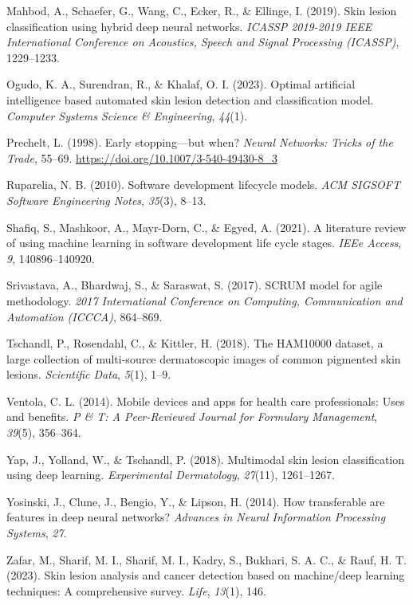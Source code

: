 \documentclass[
  12pt,
  oneside]{article}
\newlength{\cslhangindent}
\newenvironment{CSLReferences}[2] %
 {\begin{list}{}{%
  \setlength{\itemindent}{0pt}
  \setlength{\leftmargin}{0pt}
  \setlength{\parsep}{0pt}
  \ifodd #1
   \setlength{\leftmargin}{\cslhangindent}
   \setlength{\itemindent}{-1\cslhangindent}
  \fi
  \setlength{\itemsep}{#2\baselineskip}}}
 {\end{list}}
\begin{document}
\begin{CSLReferences}{1}{0}
Mahbod, A., Schaefer, G., Wang, C., Ecker, R., \& Ellinge, I. (2019).
Skin lesion classification using hybrid deep neural networks.
\emph{ICASSP 2019-2019 IEEE International Conference on Acoustics,
Speech and Signal Processing (ICASSP)}, 1229--1233.

Ogudo, K. A., Surendran, R., \& Khalaf, O. I. (2023). Optimal artificial
intelligence based automated skin lesion detection and classification
model. \emph{Computer Systems Science \& Engineering}, \emph{44}(1).

Prechelt, L. (1998). Early stopping---but when? \emph{Neural Networks:
Tricks of the Trade}, 55--69.
\url{https://doi.org/10.1007/3-540-49430-8_3}

Ruparelia, N. B. (2010). Software development lifecycle models.
\emph{ACM SIGSOFT Software Engineering Notes}, \emph{35}(3), 8--13.

Shafiq, S., Mashkoor, A., Mayr-Dorn, C., \& Egyed, A. (2021). A
literature review of using machine learning in software development life
cycle stages. \emph{IEEe Access}, \emph{9}, 140896--140920.

Srivastava, A., Bhardwaj, S., \& Saraswat, S. (2017). SCRUM model for
agile methodology. \emph{2017 International Conference on Computing,
Communication and Automation (ICCCA)}, 864--869.

Tschandl, P., Rosendahl, C., \& Kittler, H. (2018). The HAM10000
dataset, a large collection of multi-source dermatoscopic images of
common pigmented skin lesions. \emph{Scientific Data}, \emph{5}(1),
1--9.

Ventola, C. L. (2014). Mobile devices and apps for health care
professionals: Uses and benefits. \emph{P \& T: A Peer-Reviewed Journal
for Formulary Management}, \emph{39}(5), 356--364.

Yap, J., Yolland, W., \& Tschandl, P. (2018). Multimodal skin lesion
classification using deep learning. \emph{Experimental Dermatology},
\emph{27}(11), 1261--1267.

Yosinski, J., Clune, J., Bengio, Y., \& Lipson, H. (2014). How
transferable are features in deep neural networks? \emph{Advances in
Neural Information Processing Systems}, \emph{27}.

Zafar, M., Sharif, M. I., Sharif, M. I., Kadry, S., Bukhari, S. A. C.,
\& Rauf, H. T. (2023). Skin lesion analysis and cancer detection based
on machine/deep learning techniques: A comprehensive survey.
\emph{Life}, \emph{13}(1), 146.

\end{CSLReferences}
\end{document}
